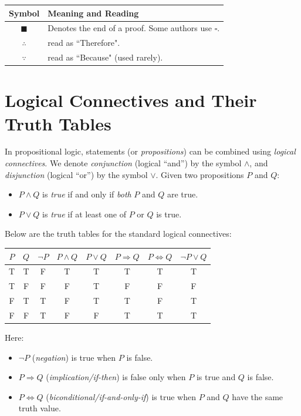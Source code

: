 \begin{center}
\begin{tabular}{|c|l|}
    \hline
    \textbf{Symbol} & \textbf{Meaning and Reading} \\
    \hline
    $\blacksquare$ & Denotes the end of a proof. Some authors use $\square$. \index{$\blacksquare$}\\
    $\therefore$ & read as ``Therefore". \index{$\therefore$}\\
    $\because$ & read as ``Because" (used rarely). \index{$\because$} \\
    \hline
\end{tabular}
\end{center}
\newpage
\section{Logical Connectives and Their Truth Tables}

In propositional logic, statements (or \emph{propositions}) can be combined using
\emph{logical connectives}. We denote \emph{conjunction} (logical ``and'') by the symbol $\land$,
and \emph{disjunction} (logical ``or'') by the symbol $\lor$.
Given two propositions $P$ and $Q$:

\begin{itemize}
    \item $P \land Q$ is \emph{true} if and only if \emph{both} $P$ and $Q$ are true.
    \item $P \lor Q$ is \emph{true} if at least one of $P$ or $Q$ is true.
\end{itemize}

\noindent Below are the truth tables for the standard logical connectives:

\begin{center}
\begin{tabular}{c c | c c c c c c}
$P$ & $Q$ & $\lnot P$ & $P \land Q$ & $P \lor Q$ & $P \Rightarrow Q$ & $P \Leftrightarrow Q$ & $\lnot P \lor Q$ \\
\hline
T & T & F & T & T & T & T & T \\
T & F & F & F & T & F & F & F \\
F & T & T & F & T & T & F & T \\
F & F & T & F & F & T & T & T \\
\end{tabular}
\end{center}

\noindent Here:
\begin{itemize}
    \item $\lnot P$ (\emph{negation}) is true when $P$ is false.
    \item $P \Rightarrow Q$ (\emph{implication/if-then}) is false only when $P$ is true and $Q$ is false.
    \item $P \Leftrightarrow Q$ (\emph{biconditional/if-and-only-if}) is true when $P$ and $Q$ have the same truth value.
\end{itemize}

